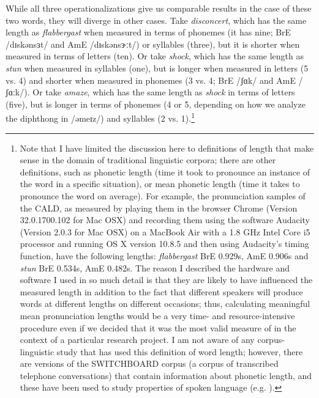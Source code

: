 While all three operationalizations  give us comparable results in the case of these two words, they will diverge in other cases. Take \textit{disconcert}, which has the same length  as \textit{flabbergast} when measured  in terms of phonemes  (it has nine; BrE  /dɪskənsɜt/ and AmE /dɪskənsɝːt/) or syllables  (three), but it is shorter when measured in terms of letters (ten). Or take \textit{shock}, which has the same length as \textit{stun} when measured in syllables  (one), but is longer when measured in letters (5 vs. 4) and shorter when measured in phonemes  (3 vs. 4; BrE  /ʃɑk/ and AmE /ʃɑːk/). Or take \textit{amaze}, which has the same length  as \textit{shock} in terms of letters (five), but is longer in terms of phonemes (4 or 5, depending on how we analyze the diphthong in /əmeɪz/) and syllables  (2 vs. 1).\footnote{Note that I have limited the discussion here to definitions of length that make sense in the domain of traditional linguistic corpora; there are other definitions, such as phonetic length (time it took to pronounce  an instance of the word in a specific situation), or mean  phonetic length  (time it takes to pronounce the word on average). For example, the pronunciation samples of the CALD, as measured  by playing them in the browser Chrome (Version 32.0.1700.102 for Mac OSX) and recording them using the software Audacity (Version 2.0.3 for Mac OSX) on a MacBook Air with a 1.8 GHz Intel Core i5 processor and running OS X version 10.8.5 and then using Audacity's timing function, have the following lengths: \textit{flabbergast} BrE  0.929s, AmE 0.906s and \textit{stun} BrE 0.534s, AmE 0.482s. The reason I described the hardware and software I used in so much detail is that they are likely to have influenced the measured  length  in addition to the fact that different speakers will produce words at different lengths on different occasions; thus, calculating meaningful mean  pronunciation lengths would be a very time- and resource\hyp{}intensive procedure even if we decided that it was the most valid  measure of  in the context of a particular research project. I am not aware of any corpus\hyp{}linguistic study that has used this definition of word length; however, there are versions of the SWITCHBOARD corpus (a corpus of transcribed  telephone conversations) that contain information about phonetic length, and these have been used to study properties of spoken language (e.g. \citealt{greenberg_insights_1996,greenberg_temporal_2003}).}

